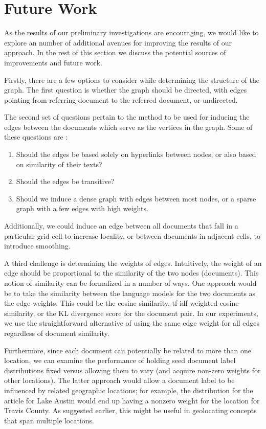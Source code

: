 \section{Future Work}  

As the results of our preliminary investigations are encouraging, we would like to explore an number of additional avenues
for improving the results of our approach. In the rest of this section we discuss the potential sources of improvements and future work.

\par Firstly, there are a few options to consider while determining the structure of the
graph. The first question is whether the graph should be directed, with edges
pointing from referring document to the referred document, or undirected. 

\par The second set of questions pertain to the method to be used for inducing
the edges between the documents which serve as the vertices in the graph. Some of these questions are :

\begin{enumerate}
    \item Should the edges be based solely on hyperlinks between nodes, or also based on similarity of their texts?
    \item Should the edges be transitive?
    \item Should we induce a dense graph with edges between most nodes, or a sparse graph with a few edges with high weights. 
\end{enumerate}

Additionally, we could induce an edge between
all documents that fall in a particular grid cell to increase locality, or
between documents in adjacent cells, to introduce smoothing.

\par A third challenge is determining the weights of edges. Intuitively, the
weight of an edge should be proportional to the similarity of the two nodes
(documents). This notion of similarity can be formalized in a number of ways.
One approach would be to take the similarity between the language models for
the two documents as the edge weights. This could be the cosine similarity,
tf-idf weighted cosine similarity, or the KL divergence score for the document pair. 
In our experiments, we use the straightforward alternative of using the 
same edge weight for all edges regardless of document similarity.

 
\par Furthermore, since each document can potentially be related to more than
one location, we can examine the performance of holding seed document label
distributions fixed versus allowing them to vary (and acquire non-zero weights
for other locations). The latter approach would allow a document label to be
influenced by related geographic locations;  for example, the distribution for
the article for Lake Austin would end up having a nonzero weight for the
location for Travis County. As suggested earlier, this might be useful in
geolocating concepts that span multiple locations.


